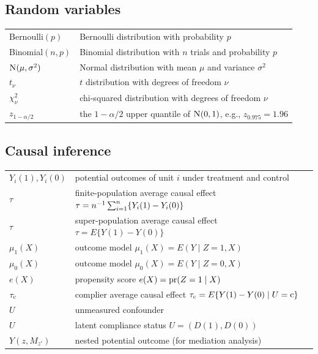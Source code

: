 \subsection*{Random variables}

\begin{tabular}{ll}
\hline 
Bernoulli$(p)$ & Bernoulli distribution with probability $p$\\
Binomial$(n,p)$& Binomial distribution with $n$ trials and probability $p$\\
$\textsc{N}(\mu, \sigma^2)$ & Normal distribution with mean $\mu$ and variance $\sigma^2$\\
$t_\nu$ & $t$ distribution with degrees of freedom $\nu$ \\
$\chi^2_\nu$ & chi-squared distribution with degrees of freedom $\nu$\\
$z_{1-\alpha/2}$ & the $1-\alpha/2$ upper quantile of $\N01$, e.g., $z_{0.975}=1.96$\\
\hline 
\end{tabular}


\subsection*{Causal inference}

\begin{tabular}{ll}
\hline 
 $Y_i(1), Y_i(0)$ & potential outcomes of unit $i$ under treatment and control\\
$\tau$ & finite-population average causal effect $\tau = n^{-1}\sum_{i=1}^n \{Y_i(1)-Y_i(0)\}$ \\
$\tau$ & super-population average causal effect $\tau = E \{Y(1)-Y(0)\}$\\
$\mu_1(X)$ & outcome model $\mu_1(X) = E(Y\mid Z=1, X)$\\
$\mu_0(X)$ & outcome model $\mu_0(X) = E(Y\mid Z=0, X)$\\
$e(X)$ & propensity score $e(X) = \textup{pr}(Z=1\mid X)$ \\
$\tau_{\textup{c}}$ & complier average causal effect $ \tau_{\textup{c}} = E\{ Y(1) - Y(0)\mid U=\textup{c} \} $ \\
$U$ & unmeasured confounder \\
$U$ & latent compliance status $U=(D(1), D(0))$ \\
$Y(z,M_{z'})$ & nested potential outcome (for mediation analysis)\\
 \hline 
\end{tabular}